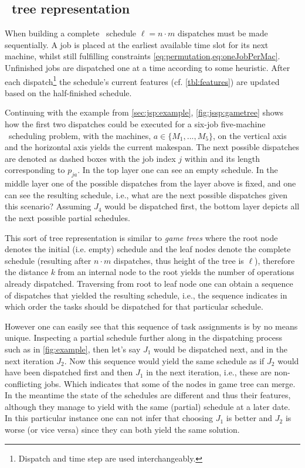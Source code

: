 \subsection{\Jsp\ tree representation}\label{sec:gen:gametree}
When building a complete \jsp\ schedule $\ell=n\cdot m$ dispatches must be made sequentially. 
A job is placed at the earliest available time slot for its next machine, whilst still fulfilling constraints \cref{eq:permutation,eq:oneJobPerMac}.
Unfinished jobs are dispatched one at a time according to some heuristic. After each dispatch\footnote{Dispatch and time step are used interchangeably.} the schedule's current features (cf. \cref{tbl:features}) are updated based on the half-finished schedule. 

Continuing with the example from \cref{sec:jsp:example}, \cref{fig:jssp:gametree} shows how the first two dispatches could be executed for a six-job five-machine \jsp\ scheduling problem, with the machines, $a\in\{M_1,...,M_5\}$, on the vertical axis and the horizontal axis yields the current makespan. The next possible dispatches are denoted as dashed boxes with the job index $j$ within and its length corresponding to $p_{ja}$.
In the top layer one can see an empty schedule.
In the middle layer one of the possible dispatches from the layer above is fixed, and one can see the resulting schedule, i.e., what are the next possible dispatches given this scenario? Assuming $J_4$ would be dispatched first, the bottom layer depicts all the next possible partial schedules.

This sort of tree representation is similar to \emph{game trees} \citep[cf.][]{Rosen03} where the root node denotes the initial (i.e. empty) schedule and the leaf nodes denote the complete schedule (resulting after $n\cdot m$ dispatches, thus height of the tree is $\ell$), therefore the distance $k$ from an internal node to the root yields the number of operations already dispatched. Traversing from root to leaf node one can obtain a sequence of dispatches that yielded the resulting schedule, i.e., the sequence indicates in which order the tasks should be dispatched for that particular schedule. 

However one can easily see that this sequence of task assignments is by no means unique. Inspecting a partial schedule further along in the dispatching process such as in \cref{fig:example}, then let's say $J_1$ would be dispatched next, and in the next iteration $J_2$. Now this sequence would yield the same schedule as if $J_2$ would have been dispatched first and then $J_1$ in the next iteration, i.e., these are non-conflicting jobs. Which indicates that some of the nodes in game tree can merge. In the meantime the state of the schedules are different and thus their features, although they manage to yield with the same (partial) schedule at a later date.  %
In this particular instance one can not infer that choosing $J_1$ is better and $J_2$ is worse (or vice versa) since they can both yield the same solution.


